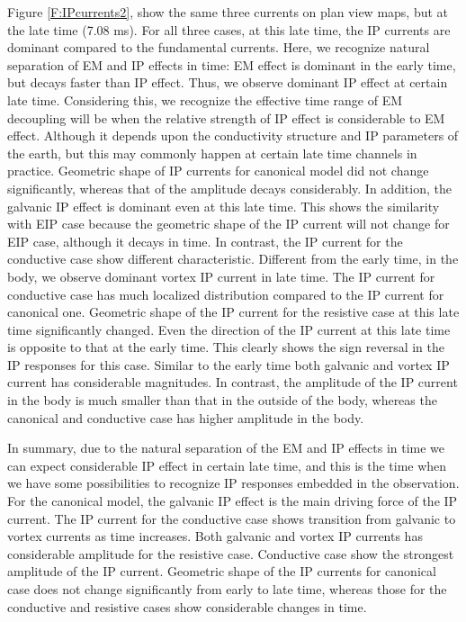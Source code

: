 \documentclass[a4paper, 11pt]{article}
\begin{document}
Figure \ref{F:IPcurrents2}, show the same three currents on plan view maps, but at the late time (7.08 ms). For all three cases, at this late time, the IP currents are dominant compared to the fundamental currents. Here, we recognize natural separation of EM and IP effects in time: EM effect is dominant in the early time, but decays faster than IP effect.  Thus, we observe dominant IP effect at certain late time. Considering this, we recognize the effective time range of EM decoupling will be when the relative strength of IP effect is considerable to EM effect. Although it depends upon the conductivity structure and IP parameters of the earth, but this may commonly happen at certain late time channels in practice. Geometric shape of IP currents for canonical model did not change significantly, whereas that of the amplitude decays considerably. In addition, the galvanic IP effect is dominant even at this late time. This shows the similarity with EIP case because the geometric  shape of the IP current will not change for EIP case, although it decays in time. In contrast, the IP current for the conductive case show different characteristic. Different from the early time, in the body, we observe dominant vortex IP current in late time. The IP current for conductive case has much localized distribution compared to the IP current for canonical one. Geometric shape of the IP current for the resistive case at this late time significantly changed. Even the direction of the IP current at this late time is opposite to that at the early time. This clearly shows the sign reversal in the IP responses for this case. Similar to the early time both galvanic and vortex IP current has considerable magnitudes. In contrast, the amplitude of the IP current in the body is much smaller than that in the outside of the body, whereas the canonical and conductive case has higher amplitude in the body. 

In summary, due to the natural separation of the EM and IP effects in time we can expect considerable IP effect in certain late time, and this is the time when we have some possibilities to recognize IP responses embedded in the observation. For the canonical model, the galvanic IP effect is the main driving force of the IP current. The IP current for the conductive case shows transition from galvanic to vortex currents as time increases. Both galvanic and vortex IP currents has considerable amplitude for the resistive case. Conductive case show the strongest amplitude of the IP current. Geometric shape of the IP currents for canonical case does not change significantly from early to late time, whereas those for the conductive and resistive cases show considerable changes in time. 
\end{document}

